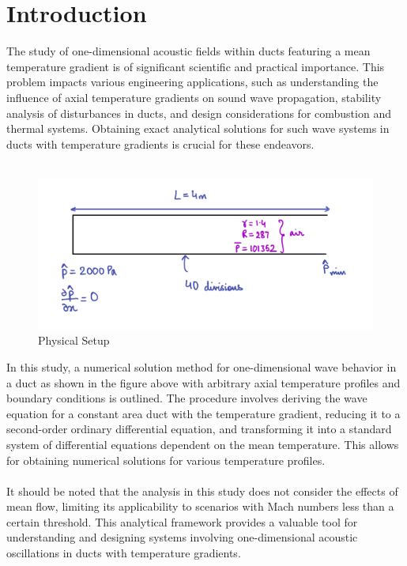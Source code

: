 \documentclass[8pt]{article} %
\begin{document}
\section{Introduction}

The study of one-dimensional acoustic fields within ducts featuring a mean temperature gradient is of significant scientific and practical importance. This problem impacts various engineering applications, such as understanding the influence of axial temperature gradients on sound wave propagation, stability analysis of disturbances in ducts, and design considerations for combustion and thermal systems. Obtaining exact analytical solutions for such wave systems in ducts with temperature gradients is crucial for these endeavors.\\\\
\begin{figure}[H]
    \centering
    \includegraphics[width=0.6\linewidth]{setup.jpg}
    \caption{Physical Setup}
    \label{fig:setup}
\end{figure}
In this study, a numerical solution method for one-dimensional wave behavior in a duct as shown in the figure above with arbitrary axial temperature profiles and boundary conditions is outlined. The procedure involves deriving the wave equation for a constant area duct with the temperature gradient, reducing it to a second-order ordinary differential equation, and transforming it into a standard system of differential equations dependent on the mean temperature. This allows for obtaining numerical solutions for various temperature profiles.\\\\
It should be noted that the analysis in this study does not consider the effects of mean flow, limiting its applicability to scenarios with Mach numbers less than a certain threshold. This analytical framework provides a valuable tool for understanding and designing systems involving one-dimensional acoustic oscillations in ducts with temperature gradients.
\end{document}
